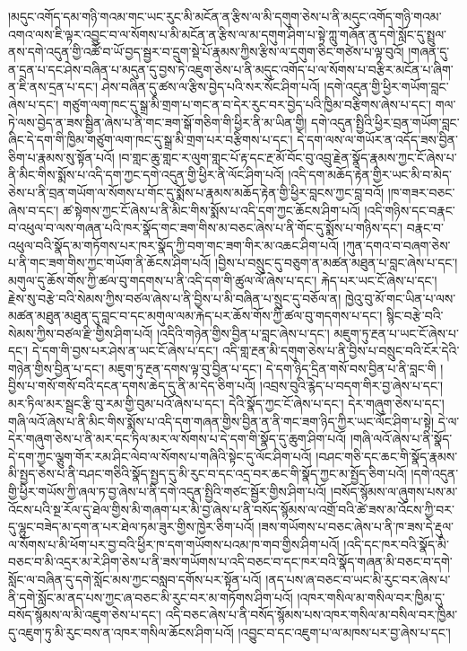 །མདུང་འགོད་དམ་གཉི་གའམ་གང་ཡང་རུང་མི་མངོན་ན་རྩིས་ལ་མི་དགུག་ཅེས་པ་ནི་མདུང་འགོད་གཉི་གའམ་འགའ་ལས་ཇི་ལྟར་འབྱུང་བ་ལ་སོགས་པ་མི་མངོན་ན་རྩིས་ལ་མ་དགུག་ཤིག་པ་སྟེ་ཀླུ་གཞོན་ནུ་དགེ་སློང་དུ་སྤྲུལ་ནས་དགེ་འདུན་གྱི་འཚོ་བ་ཡོ་བྱད་སྦྱར་བ་དྲུག་སྡེ་པོ་རྣམས་ཀྱིས་རྩིས་ལ་དགུག་ཅིང་གཙེས་པ་ལྟ་བུའོ། །གཞན་དུ་ན་དྲན་པ་དང་ཤེས་བཞིན་པ་མདུན་དུ་བྱས་ཏེ་འཇུག་ཅེས་པ་ནི་མདུང་འགོད་པ་ལ་སོགས་པ་བརྩིར་མངོན་པ་ཞིག་ན་ཇི་ནས་དྲན་པ་དང་། ཤེས་བཞིན་དུ་ཚས་ལ་རྩིས་བྱེད་པའི་སར་སོང་ཤིག་པའོ། །དགེ་འདུན་གྱི་ཕྱིར་གཡོག་བླང་ཞེས་པ་དང་། གཙུག་ལག་ཁང་དུ་སྒྲ་མི་གྲག་པ་གང་ན་བ་དེར་རུང་བར་བྱེད་པའི་ཁྱིམ་བརྩིགས་ཞེས་པ་དང་། གལ་ཏེ་ལས་བྱེད་ན་ཟས་སྦྱིན་ཞེས་པ་ནི་གང་ཟག་སྒོ་གཅིག་གི་ཕྱིར་ནི་མ་ཡིན་གྱི། དགེ་འདུན་སྤྱིའི་ཕྱིར་བྲན་གཡོག་བླང་ཞིང་དེ་དག་གི་ཁྱིམ་གཙུག་ལག་ཁང་དུ་སྒྲ་མི་གྲག་པར་བརྩིགས་པ་དང་། དེ་དག་ལས་ལ་གཡོར་ན་འདོད་ཟས་བྱིན་ཅིག་པ་རྣམས་སུ་སྟོན་པའོ། །བ་གླང་ཆུ་གླང་ར་ལུག་གླང་པོ་རྟ་དང་རྔ་མོ་བོང་བུ་འབྲུ་རྗེན་སྣོད་རྣམས་ཀྱང་ངོ་ཞེས་པ་ནི་མིང་གིས་སྨོས་པ་འདི་དག་ཀྱང་དགེ་འདུན་གྱི་ཕྱིར་ནི་ལོང་ཤིག་པའོ། །འདི་དག་མཆོད་རྟེན་གྱིར་ཡང་མི་བ་མེད་ཅེས་པ་ནི་བྲན་གཡོག་ལ་སོགས་པ་གོང་དུ་སྨོས་པ་རྣམས་མཆོད་རྟེན་གྱི་ཕྱིར་བླངས་ཀྱང་བླ་བའོ། །ཁ་གཟར་བཅང་ཞེས་བ་དང་། ཚ་སྟེགས་ཀྱང་ངོ་ཞེས་པ་ནི་མིང་གིས་སྨོས་པ་འདི་དག་ཀྱང་ཆོངས་ཤིག་པའོ། །འདི་གཉིས་དང་བརྣང་བ་འཕུལ་བ་ལས་གཞན་པའི་ཁར་སྣོད་གང་ཟག་གིས་མ་བཅང་ཞེས་པ་ནི་གོང་དུ་སྨོས་པ་གཉིས་དང་། བརྣང་བ་འཕུལ་བའི་སྣོད་མ་གཏོགས་པར་ཁར་སྣོད་ཀྱི་བག་གང་ཟག་གིར་མ་འཆང་ཤིག་པའོ། །ཀུན་དགའ་བ་བཞག་ཅེས་པ་ནི་གང་ཟག་གིས་ཀྱང་གཡོག་ནི་ཆོངས་ཤིག་པའོ། །བྱིས་པ་བསྲུང་དུ་བཅུག་ན་མཚན་མཐུན་པ་བླང་ཞེས་པ་དང་། མགུལ་དུ་ཆོས་གོས་ཀྱི་ཚལ་བུ་གདགས་པ་ནི་འདི་དག་གི་ཚུལ་ལོ་ཞེས་པ་དང་། རྐེད་པར་ཡང་ངོ་ཞེས་པ་དང་། རྗེས་སུ་བརྩེ་བའི་སེམས་ཀྱིས་བཙལ་ཞེས་པ་ནི་བྱིས་པ་མི་བཞིན་པ་སྲུང་དུ་བཅོལ་ན། ཁྱེའུ་བུ་མོ་གང་ཡིན་པ་ལས་མཚན་མཐུན་མཐུན་དུ་བླང་བ་དང་མགུལ་ལམ་རྐེད་པར་ཆོས་གོས་ཀྱི་ཚལ་བུ་གདགས་པ་དང་། སྙིང་བརྩེ་བའི་སེམས་ཀྱིས་བཙལ་རྫི་གྱིས་ཤིག་པའོ། །འདིའི་གཉེན་གྱིས་བྱིན་པ་བླང་ཞེས་པ་དང་། མཇུག་ཏུ་རྔན་པ་ཡང་ངོ་ཞེས་པ་དང་། དེ་དག་གི་བྱས་པར་ཤེས་ན་ཡང་ངོ་ཞེས་པ་དང་། འདི་གླ་རྔན་མི་དགུག་ཅེས་པ་ནི་བྱིས་པ་བསྲུང་བའི་ངོར་དེའི་གཉེན་གྱིས་བྱིན་པ་དང་། མཇུག་ཏུ་རྔན་དགས་ལྟ་བུ་བྱིན་པ་དང་། དེ་དག་ཉིད་དྲིན་གསོ་བས་བྱིན་པ་ནི་བླང་གི །བྱིས་པ་གསོ་གསོ་བའི་དངན་དགས་ཆེད་དུ་ནི་མ་དེད་ཅིག་པའོ། །འབྲས་བུའི་རྙེད་པ་བདག་གིར་བྱ་ཞེས་པ་དང་། མར་ཏིལ་མར་སྦྲང་རྩི་བུ་རམ་གྱི་བུམ་པའོ་ཞེས་པ་དང་། དེའི་སྣོད་ཀྱང་ངོ་ཞེས་པ་དང་། དེར་གཞུག་ཅེས་པ་དང་། གཞི་ལའོ་ཞེས་པ་ནི་མིང་གིས་སྨོས་པ་འདི་དག་གཞན་གྱིས་བྱིན་ན་ནི་གང་ཟག་ཉིད་ཀྱིར་ཡང་ལོང་ཤིག་པ་སྟེ། དེ་ལ་དེར་གཞུག་ཅེས་པ་ནི་མར་དང་ཏིལ་མར་ལ་སོགས་པ་དེ་དག་གི་སྣོད་དུ་ཆུག་ཤིག་པའོ། །གཞི་ལའོ་ཞེས་པ་ནི་སྣོད་དེ་དག་ཀྱང་ལྕུག་གོར་རམ་ཤིང་ལེབ་ལ་སོགས་པ་གཞིའི་སྟེང་དུ་ལོང་ཤིག་པའོ། །བཤང་གཅི་དང་ཆང་གི་སྣོད་རྣམས་མི་སྤྱད་ཅེས་པ་ནི་བཤང་གཅིའི་སྣོད་སྤྱད་དུ་མི་རུང་བ་དང་འདྲ་བར་ཆང་གི་སྣོད་ཀྱང་མ་སྤྱོད་ཅིག་པའོ། །དགེ་འདུན་གྱི་ཕྱིར་གཡོས་ཀྱི་ཞལ་ཏ་བྱ་ཞེས་པ་ནི་དགེ་འདུན་སྤྱིའི་གཙང་སྦྱོར་གྱིས་ཤིག་པའོ། །བསོད་སྙོམས་ལ་ཞུགས་པས་མ་འོངས་པའི་སྔ་རོལ་དུ་ཐེལ་གྱིས་མི་གཞག་པར་མི་བྱ་ཞེས་པ་ནི་བསོད་སྙོམས་ལ་འགྲོ་བའི་ཚེ་ཟས་མ་འོངས་ཀྱི་བར་དུ་ལྷུང་བཟེད་མ་དག་ན་པར་ཐེལ་ཏམ་ཟུར་གྱིས་ཁྱེར་ཅིག་པའོ། །ཟས་གཡོགས་པ་བཅང་ཞེས་པ་ནི་ཁ་ཟས་དེ་རྡུལ་ལ་སོགས་པ་མི་ཕོག་པར་བྱ་བའི་ཕྱིར་ཁ་དག་གཡོགས་པའམ་ཁ་གབ་གྱིས་ཤིག་པའོ། །འདི་དང་ཁར་བའི་སྣོད་མི་བཅང་བ་མི་འདྲར་མ་རེ་ཤིག་ཅེས་པ་ནི་ཟས་གཡོགས་པ་འདི་བཅང་བ་དང་ཁར་བའི་སྣོད་གཞན་མི་བཅང་བ་དགེ་སློང་ལ་བཞིན་དུ་དགེ་སློང་མས་ཀྱང་བསླབ་དགོས་པར་སྟོན་པའོ། །ནད་པས་ཞ་བཅང་བ་ཡང་མི་རུང་བར་ཞེས་པ་ནི་དགེ་སློང་མ་ནད་པས་ཀྱང་ཞ་བཅང་མི་རུང་བར་མ་གཏོགས་ཤིག་པའོ། །འཁར་གསིལ་མ་གསིལ་བར་ཁྱིམ་དུ་བསོད་སྙོམས་ལ་མི་འཇུག་ཅེས་པ་དང་། འདི་བཅང་ཞེས་པ་ནི་བསོད་སྙོམས་པས་འཁར་གསིལ་མ་བསིལ་བར་ཁྱིམ་དུ་འཇུག་ཏུ་མི་རུང་བས་ན་འཁར་གསིལ་ཆོངས་ཤིག་པའོ། །འབྱུང་བ་དང་འཇུག་པ་ལ་མཁས་པར་བྱ་ཞེས་པ་དང་། 